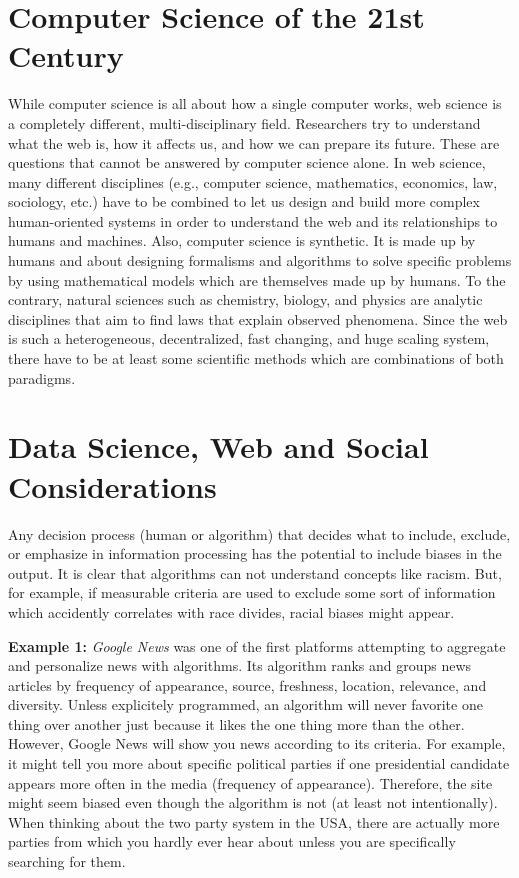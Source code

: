 \documentclass[a4paper]{article}
\begin{document}
\section{Computer Science of the 21st Century}
While computer science is all about how a single computer works, web science is a completely different, multi-disciplinary field.
Researchers try to understand what the web is, how it affects us, and how we can prepare its future.
These are questions that cannot be answered by computer science alone.
In web science, many different disciplines (e.g., computer science, mathematics, economics, law, sociology, etc.) have to be combined to let us design and build more complex human-oriented systems in order to understand the web and its relationships to humans and machines.
Also, computer science is synthetic.
It is made up by humans and about designing formalisms and algorithms to solve specific problems by using mathematical models which are themselves made up by humans.
To the contrary, natural sciences such as chemistry, biology, and physics are analytic disciplines that aim to find laws that explain observed phenomena.
Since the web is such a heterogeneous, decentralized, fast changing, and huge scaling system, there have to be at least some scientific methods which are combinations of both paradigms.

\section{Data Science, Web and Social Considerations}
Any decision process (human or algorithm) that decides what to include, exclude, or emphasize in information processing has the potential to include biases in the output.
It is clear that algorithms can not understand concepts like racism.
But, for example, if measurable criteria are used to exclude some sort of information which accidently correlates with race divides, racial biases might appear.

\textbf{Example 1:}
\emph{Google News} was one of the first platforms attempting to aggregate and personalize news with algorithms.
Its algorithm ranks and groups news articles by frequency of appearance, source, freshness, location, relevance, and diversity.
Unless explicitely programmed, an algorithm will never favorite one thing over another just because it likes the one thing more than the other.
However, Google News will show you news according to its criteria.
For example, it might tell you more about specific political parties if one presidential candidate appears more often in the media (frequency of appearance).
Therefore, the site might seem biased even though the algorithm is not (at least not intentionally).
When thinking about the two party system in the USA, there are actually more parties from which you hardly ever hear about unless you are specifically searching for them.\\
\end{document}
